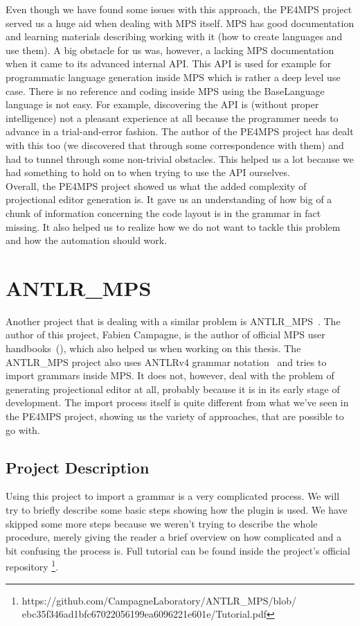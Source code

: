 Even though we have found some issues with this approach, the PE4MPS project served us a huge aid when dealing with MPS itself.
MPS has good documentation and learning materials describing working with it (how to create languages and use them).
A big obstacle for us was, however, a lacking MPS documentation when it came to its advanced internal API.
This API is used for example for programmatic language generation inside MPS which is rather a deep level use case.
There is no reference and coding inside MPS using the BaseLanguage language is not easy.
For example, discovering the API is (without proper intelligence) not a pleasant experience at all because the programmer needs to advance in a trial-and-error fashion.
The author of the PE4MPS project has dealt with this too (we discovered that through some correspondence with them) and had to tunnel through some non-trivial obstacles.
This helped us a lot because we had something to hold on to when trying to use the API ourselves.
\\

Overall, the PE4MPS project showed us what the added complexity of projectional editor generation is.
It gave us an understanding of how big of a chunk of information concerning the code layout is in the grammar in fact missing.
It also helped us to realize how we do not want to tackle this problem and how the automation should work.

\section{ANTLR{\_}MPS}
Another project that is dealing with a similar problem is ANTLR{\_}MPS~\cite{ANTLR2MPS}.
The author of this project, Fabien Campagne, is the author of official MPS user handbooks~(\cite{MPS1}\cite{MPS2}), which also helped us when working on this thesis.
The ANTLR{\_}MPS project also uses ANTLRv4 grammar notation~\cite{ANTLR4} and tries to import grammars inside MPS.
It does not, however, deal with the problem of generating projectional editor at all, probably because it is in its early stage of development.
The import process itself is quite different from what we've seen in the PE4MPS project, showing us the variety of approaches, that are possible to go with.

\subsection{Project Description}
Using this project to import a grammar is a very complicated process.
We will try to briefly describe some basic steps showing how the plugin is used.
We have skipped some more steps because we weren't trying to describe the whole procedure, merely giving the reader a brief overview on how complicated and a bit confusing the process is.
Full tutorial can be found inside the project's official repository \footnote{https://github.com/CampagneLaboratory/ANTLR{\_}MPS/blob/ ebc35f346ad1bfc67022056199ea6096221e601e/Tutorial.pdf}.
\\

